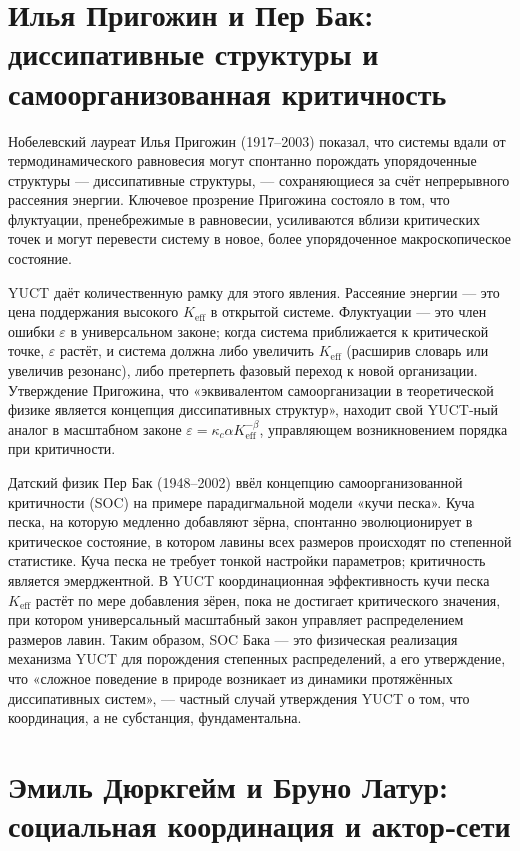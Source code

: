 \documentclass[12pt,a4paper]{article}
\begin{document}
	\section{Илья Пригожин и Пер Бак: диссипативные структуры и самоорганизованная критичность}
	
	Нобелевский лауреат Илья Пригожин (1917–2003) показал, что системы вдали от термодинамического равновесия могут спонтанно порождать упорядоченные структуры — диссипативные структуры, — сохраняющиеся за счёт непрерывного рассеяния энергии. Ключевое прозрение Пригожина состояло в том, что флуктуации, пренебрежимые в равновесии, усиливаются вблизи критических точек и могут перевести систему в новое, более упорядоченное макроскопическое состояние.
	
	YUCT даёт количественную рамку для этого явления. Рассеяние энергии — это цена поддержания высокого \(K_{\mathrm{eff}}\) в открытой системе. Флуктуации — это член ошибки \(\varepsilon\) в универсальном законе; когда система приближается к критической точке, \(\varepsilon\) растёт, и система должна либо увеличить \(K_{\mathrm{eff}}\) (расширив словарь или увеличив резонанс), либо претерпеть фазовый переход к новой организации. Утверждение Пригожина, что «эквивалентом самоорганизации в теоретической физике является концепция диссипативных структур», находит свой YUCT‑ный аналог в масштабном законе \(\varepsilon = \kappa_c \alpha K_{\mathrm{eff}}^{-\beta}\), управляющем возникновением порядка при критичности.
	
	Датский физик Пер Бак (1948–2002) ввёл концепцию самоорганизованной критичности (SOC) на примере парадигмальной модели «кучи песка». Куча песка, на которую медленно добавляют зёрна, спонтанно эволюционирует в критическое состояние, в котором лавины всех размеров происходят по степенной статистике. Куча песка не требует тонкой настройки параметров; критичность является эмерджентной. В YUCT координационная эффективность кучи песка \(K_{\mathrm{eff}}\) растёт по мере добавления зёрен, пока не достигает критического значения, при котором универсальный масштабный закон управляет распределением размеров лавин. Таким образом, SOC Бака — это физическая реализация механизма YUCT для порождения степенных распределений, а его утверждение, что «сложное поведение в природе возникает из динамики протяжённых диссипативных систем», — частный случай утверждения YUCT о том, что координация, а не субстанция, фундаментальна.
	
	\section{Эмиль Дюркгейм и Бруно Латур: социальная координация и актор‑сети}
	
\end{document}
